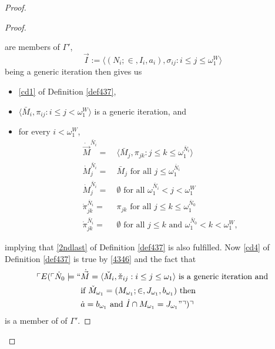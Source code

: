 \documentclass[12pt]{article}
\numberwithin{equation}{section}
\begin{document}
\begin{proof}
\begin{proof}
\begin{itemize}
\end{itemize}
are members of $\Gamma'$, 
\begin{equation*}
    \Vec{I} := \langle (N_i; \in, I_i, a_i), \sigma_{ij} : i \leq j \leq \omega_1^W \rangle
\end{equation*}
being a generic iteration then gives us
\begin{itemize}
    \item \ref{cd1} of Definition \ref{def437},
    \item $\langle \bar{M}_i, \pi_{ij} : i \leq j < \omega_1^W \rangle$ is a generic iteration, and
    \item for every $i < \omega_1^W$,
    \begin{align*}
         \dot{\Vec{M}}^{\bar{N}_i} = \ & \langle \bar{M}_j, \pi_{jk} : j \leq k \leq \omega_1^{\bar{N}_i} \rangle \\
         \dot{M}_j^{\bar{N}_i} = \ & \bar{M}_j \text{ for all } j \leq \omega_1^{\bar{N}_i} \\
         \dot{M}_j^{\bar{N}_i} = \ & \emptyset \text{ for all } \omega_1^{\bar{N}_i} < j < \omega_1^W \\
         \dot{\pi}_{jk}^{\bar{N}_i} = \ & \pi_{jk} \text{ for all } j \leq k \leq \omega_1^{\bar{N}_0} \\
         \dot{\pi}_{jk}^{\bar{N}_i} = \ & \emptyset \text{ for all } j \leq k \text{ and } \omega_1^{\bar{N}_0} < k < \omega_1^W \text{,}
    \end{align*}
\end{itemize}
implying that \ref{2ndlast} of Definition \ref{def437} is also fulfilled. Now \ref{cd4} of Definition \ref{def437} is true by \ref{4346} and the fact that 
\begin{align*}
    \ulcorner E(\ulcorner \dot{N}_0 \models `` & \dot{\Vec{M}} = \langle \check{M}_{i}, \check{\pi}_{ij} : i \leq j \leq \omega_1 \rangle \text{ is a generic iteration and} \\ 
    & \text{if } \check{M}_{\omega_1} = (M_{\omega_1}; \in, J_{\omega_1}, b_{\omega_1}) \text{ then} \\
    &  \dot{a} = b_{\omega_1} \text{ and } \dot{I} \cap M_{\omega_1} = J_{\omega_1}" \urcorner) \urcorner
\end{align*}
is a member of of $\Gamma'$.


\end{proof}
\end{proof}
\end{document}

